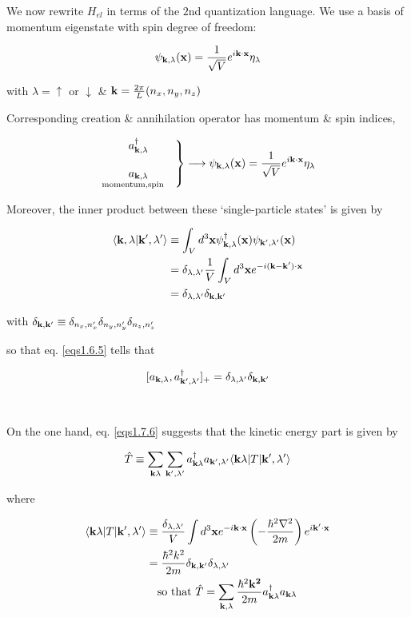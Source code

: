 We now rewrite $H_{el}$ in terms of the $2$nd quantization language. We use a basis of momentum eigenstate with spin degree of freedom:

\[\psi_{{\bf k},\lambda}({\bf x})=\frac{1}{\sqrt{V}}e^{i\bf k\cdot x}\eta_\lambda \]

with $\lambda=\uparrow$ or $\downarrow$ \& ${\bf k}=\frac{2\pi}{L}(n_x,n_y,n_z)$

Corresponding creation \& annihilation operator has momentum \& spin indices, 

\[
\left.\begin{matrix}
a^\dagger_{{\bf k},\lambda} \\
\ \\
\underset{\text{momentum,spin}\quad}{a_{{\bf k},{\lambda}}}
\end{matrix}\right\}\longrightarrow\psi_{{\bf k},\lambda}({\bf x})=\frac{1}{\sqrt{V}}e^{i\bf k\cdot x}\eta_\lambda 
\]

Moreover, the inner product between these `single-particle states' is given by

\[\begin{split}
\langle {\bf k},\lambda|{\bf k'},\lambda'\rangle&\equiv\int_V d^3{\bf x}\psi_{{\bf k},\lambda}^\dagger({\bf x})\psi_{{\bf k'},\lambda'}({\bf x}) \\
&=\delta_{\lambda,\lambda'}\frac{1}{V}\int_V d^3{\bf x}e^{-i\bf (k-k')\cdot x}\\
&=\delta_{\lambda,\lambda'}\delta_{\bf k,k'}
\end{split}\]

with $\delta_{\bf k,k'}\equiv\delta_{n_x,n_x'}\delta_{n_y,n_y'}\delta_{n_z,n_z'}$

so that eq. \eqref{eqs1.6.5} tells that

\[[a_{{\bf k},\lambda},a^\dagger_{{\bf k'},\lambda'}]_+=\delta_{\lambda,\lambda'}\delta_{\bf k,k'} \]

\dotfill

\ 

On the one hand, eq. \eqref{eqs1.7.6} suggests that the kinetic energy part is given by

\[\hat{T}\equiv\sum_{{\bf k}\lambda}\sum_{{\bf k'},\lambda'}a^\dagger_{{\bf k}\lambda} a_{{\bf k'},\lambda'}\langle{\bf k}\lambda|T|{\bf k'},\lambda'\rangle\]

where

\begin{align}\label{eq1.8.11}
\begin{split}
\langle{\bf k}\lambda|T|{\bf k'},\lambda'\rangle&\equiv\frac{\delta_{\lambda,\lambda'}}{V}\int d^3{\bf x}e^{-i\bf k\cdot x}\left(-\frac{\hbar^2\nabla^2}{2m}\right)e^{i\bf k'\cdot x}\\
&=\frac{\hbar^2 k^2}{2m}\delta_{\bf k,k'}\delta_{\lambda,\lambda'}\\
&\quad\text{so that }\hat{T}=\sum_{{\bf k},\lambda}\frac{\hbar^2\bf k^2}{2m}a^\dagger_{{\bf k}\lambda}a_{{\bf k}\lambda}
\end{split}
\end{align}


